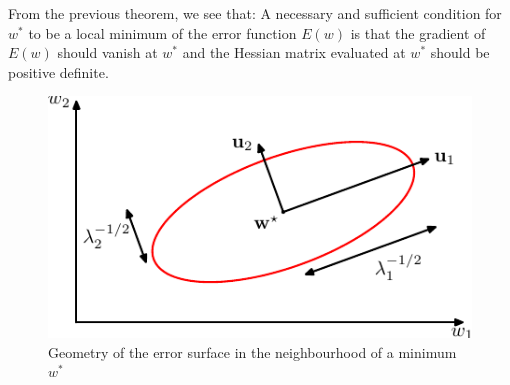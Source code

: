 \documentclass{beamer}
\begin{document}
\begin{frame}
    From the previous theorem, we see that: A necessary and sufficient condition for $w^{*}$ to be a local minimum of the error function $E(w)$ is that the gradient of $E(w)$ should vanish at $w^{*}$ and the Hessian matrix evaluated at $w^{*}$ should be positive definite.
    \begin{figure}
        \caption{Geometry of the error surface in the neighbourhood of a minimum $w^{*}$}
        \includegraphics{Figure_2.pdf}
    \end{figure}
\end{frame}
\end{document}

